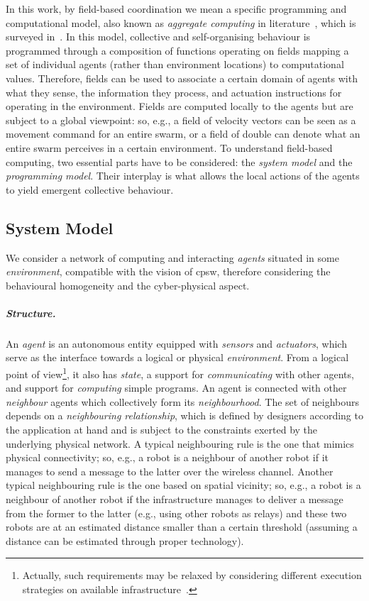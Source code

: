 In this work, by field-based coordination we mean a specific programming and computational model,
 also known as \emph{aggregate computing} in literature~\cite{aggregatecomputing},
 which is surveyed in~\cite{DBLP:journals/jlap/ViroliBDACP19}.
In this model,  
 collective and self-organising behaviour
 is programmed through a composition
 of functions operating on fields
 mapping a set of individual agents (rather than environment locations)
 to computational values.
%
Therefore, fields can be used to associate a certain domain of agents
 with what they sense, the information they process, and actuation instructions for operating in the environment.
%
Fields are computed locally to the agents
 but are subject to a global viewpoint:
 so, e.g., a field of velocity vectors can be seen as a movement command for an entire swarm, or
 a field of double can denote what an entire swarm perceives in a certain environment.
%
To understand field-based computing,
 two essential parts have to be considered: the \emph{system model}
 and the \emph{programming model}.
 Their interplay is what allows the local actions of the agents
 to yield emergent collective behaviour.

\subsection{System Model}\label{ssec:background:sysmodel}
We consider a network of computing and interacting \emph{agents} situated in some \emph{environment},
 compatible with the vision of \acf{cpsw}, therefore considering the behavioural homogeneity and the 
 cyber-physical aspect. 

\subparagraph*{Structure.}
%
An \emph{agent} is an autonomous entity
 equipped with \emph{sensors} and \emph{actuators}, which serve as the interface towards a logical or physical \emph{environment}.
%
From a logical point of view\footnote{Actually, such requirements may be relaxed by considering different execution strategies on available infrastructure~\cite{DBLP:journals/fi/CasadeiPPVW20}.}, 
 it also has \emph{state}, a support for \emph{communicating} with other agents, 
 and support for \emph{computing} simple programs.
%
An agent is connected with other \emph{neighbour} agents which collectively form its \emph{neighbourhood}.
%
The set of neighbours depends on a \emph{neighbouring relationship}, 
 which is defined by designers according to the application at hand
 and is subject to the constraints exerted by the underlying physical network.
%
A typical neighbouring rule
 is the one that mimics physical connectivity;
 so, e.g., a robot is a neighbour of another robot if it manages to send a message to the latter over the wireless channel.
%
Another typical neighbouring rule is the one
 based on spatial vicinity;
 so, e.g., a robot is a neighbour of another robot if the infrastructure manages to deliver a message from the former to the latter (e.g., using other robots as relays)
  and these two robots are at an estimated distance smaller than a certain threshold
  (assuming a distance can be estimated through proper technology).


